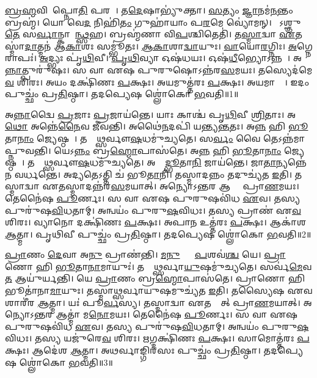 
\ul{𑌬𑍍𑌰}\ul{𑌹𑍍𑌮}𑌵𑌿𑌦𑌾᳚𑌪𑍍𑌨𑍋\ul{𑌤𑌿} 𑌪𑌰𑌮𑍍᳚। 
𑌤\ul{𑌦𑍇}𑌷𑌾𑌭𑍍𑌯𑍁॑𑌕𑍍𑌤𑌾। 
\ul{𑌸}𑌤𑍍𑌯𑌂 \ul{𑌜𑍍𑌞𑌾}𑌨𑌮॑\ul{𑌨}𑌨𑍍𑌤𑌂 𑌬𑍍𑌰𑌹𑍍𑌮॑। 
𑌯𑍋 𑌵𑍇\ul{𑌦} 𑌨𑌿𑌹𑌿॑\ul{𑌤𑌂} 𑌗𑍁𑌹𑌾॑𑌯𑌾𑌂 𑌪\ul{𑌰}𑌮𑍇 𑌵𑍍𑌯𑍋॑𑌮𑌨𑍍। 
𑌸𑍋᳚𑌽𑌶𑍍𑌞𑍁\ul{𑌤𑍇} 𑌸\ul{𑌰𑍍𑌵𑌾}𑌨𑍍𑌕𑌾𑌮𑌾᳚\ul{𑌨𑍍𑌥𑍍𑌸}𑌹। 
𑌬𑍍𑌰𑌹𑍍𑌮॑𑌣𑌾 𑌵𑌿\ul{𑌪}𑌶𑍍𑌚𑌿𑌤𑍇𑌤𑌿॑। 
𑌤\ul{𑌸𑍍𑌮𑌾}𑌦𑍍𑌵𑌾 \ul{𑌏}𑌤𑌸𑍍𑌮𑌾॑\ul{𑌦𑌾}𑌤𑍍𑌮𑌨॑ 𑌆\ul{𑌕𑌾}𑌶𑌃 𑌸𑌮𑍍𑌭𑍂॑𑌤𑌃। 
\ul{𑌆}\ul{𑌕𑌾}𑌶𑌾\ul{𑌦𑍍𑌵𑌾}𑌯𑍁𑌃। 
\ul{𑌵𑌾}𑌯𑍋\ul{𑌰}𑌗𑍍𑌨𑌿𑌃। 
\ul{𑌅}𑌗𑍍𑌨𑍇𑌰𑌾𑌪𑌃॑। 
\ul{𑌅}𑌦𑍍𑌭𑍍𑌯𑌃 𑌪𑍃॑\ul{𑌥𑌿}𑌵𑍀। 
\ul{𑌪𑍃}\ul{𑌥𑌿}𑌵𑍍𑌯𑌾 𑌓𑌷॑𑌧𑌯𑌃। 
𑌓𑌷॑\ul{𑌧𑍀}𑌭𑍍𑌯𑍋𑌽𑌨𑍍𑌨𑌮𑍍᳚। 
𑌅\ul{𑌨𑍍𑌨𑌾}𑌤𑍍𑌪𑍁𑌰𑍁॑𑌷𑌃। 
𑌸 𑌵𑌾 𑌏𑌷 𑌪𑍁𑌰𑍁𑌷𑍋𑌽𑌨𑍍𑌨॑𑌰\ul{𑌸}𑌮𑌯𑌃। 
𑌤𑌸𑍍𑌯𑍇𑌦॑𑌮𑍇\ul{𑌵} 𑌶𑌿𑌰𑌃। 
𑌅𑌯𑌂 𑌦𑌕𑍍𑌷𑌿॑𑌣𑌃 \ul{𑌪}𑌕𑍍𑌷𑌃। 
𑌅𑌯𑌮𑍁𑌤𑍍𑌤॑𑌰𑌃 \ul{𑌪}𑌕𑍍𑌷𑌃। 
𑌅𑌯𑌮𑌾𑌤𑍍𑌮𑌾᳚। 
𑌇𑌦𑌂 𑌪𑍁𑌚𑍍𑌛𑌂॑ 𑌪𑍍𑌰\ul{𑌤𑌿}𑌷𑍍𑌠𑌾। 
𑌤𑌦𑌪𑍍𑌯𑍇𑌷 𑌶𑍍𑌲𑍋॑𑌕𑍋 \ul{𑌭}𑌵𑌤𑌿॥1॥

𑌅\ul{𑌨𑍍𑌨𑌾}𑌦𑍍𑌵𑍈 \ul{𑌪𑍍𑌰}𑌜𑌾𑌃 \ul{𑌪𑍍𑌰}𑌜𑌾𑌯॑𑌨𑍍𑌤𑍇। 
𑌯𑌾𑌃 𑌕𑌾𑌶𑍍𑌚॑ 𑌪𑍃\ul{𑌥𑌿}𑌵𑍀 \ul{𑌶𑍍𑌰𑌿}𑌤𑌾𑌃। 
𑌅\ul{𑌥𑍋} 𑌅𑌨𑍍𑌨𑍇॑\ul{𑌨𑍈}𑌵 𑌜𑍀॑𑌵𑌨𑍍𑌤𑌿। 
𑌅𑌥𑍈॑\ul{𑌨}𑌦𑌪𑌿॑ 𑌯𑌨𑍍𑌤𑍍𑌯\ul{𑌨𑍍𑌤}𑌤𑌃। 
𑌅\ul{𑌨𑍍𑌨}\ul{} 𑌹𑌿 \ul{𑌭𑍂}𑌤𑌾\ul{𑌨𑌾𑌂} 𑌜𑍍𑌯𑍇𑌷𑍍𑌠𑌮𑍍᳚। 
𑌤𑌸𑍍𑌮𑌾᳚𑌥𑍍𑌸𑌰𑍍𑌵𑍗\ul{𑌷}𑌧𑌮𑍁॑𑌚𑍍𑌯𑌤𑍇। 
𑌸\ul{𑌰𑍍𑌵𑌂} 𑌵𑍈 𑌤𑍇𑌽𑌨𑍍𑌨॑𑌮𑌾𑌪𑍍𑌨𑍁𑌵𑌨𑍍𑌤𑌿। 
𑌯𑍇𑌽\ul{𑌨𑍍𑌨𑌂} 𑌬𑍍𑌰\ul{𑌹𑍍𑌮𑍋}𑌪𑌾𑌸॑𑌤𑍇। 
𑌅\ul{𑌨𑍍𑌨}\ul{} 𑌹𑌿 \ul{𑌭𑍂}𑌤𑌾\ul{𑌨𑌾𑌂} 𑌜𑍍𑌯𑍇𑌷𑍍𑌠𑌮𑍍᳚। 
𑌤𑌸𑍍𑌮𑌾᳚𑌥𑍍𑌸𑌰𑍍𑌵𑍗\ul{𑌷}𑌧𑌮𑍁॑𑌚𑍍𑌯𑌤𑍇। 
𑌅𑌨𑍍𑌨𑌾᳚\ul{𑌦𑍍𑌭𑍂}𑌤𑌾\ul{𑌨𑌿} 𑌜𑌾𑌯॑𑌨𑍍𑌤𑍇। 
𑌜𑌾\ul{𑌤𑌾}𑌨𑍍𑌯𑌨𑍍𑌨𑍇॑𑌨 𑌵𑌰𑍍𑌧𑌨𑍍𑌤𑍇। 
𑌅𑌦𑍍𑌯𑌤𑍇𑌽𑌤𑍍𑌤𑌿 𑌚॑ 𑌭𑍂\ul{𑌤𑌾}𑌨𑌿। 
𑌤𑌸𑍍𑌮𑌾𑌦𑌨𑍍𑌨𑌂 𑌤𑌦𑍁𑌚𑍍𑌯॑𑌤 \ul{𑌇}𑌤𑌿। 
𑌤𑌸𑍍𑌮𑌾𑌦𑍍𑌵𑌾 𑌏𑌤𑌸𑍍𑌮𑌾𑌦𑌨𑍍𑌨॑𑌰\ul{𑌸}𑌮𑌯𑌾𑌤𑍍। 
𑌅𑌨𑍍𑌯𑍋𑌽𑌨𑍍𑌤𑌰 𑌆𑌤𑍍𑌮𑌾᳚ 𑌪𑍍𑌰𑌾\ul{𑌣}𑌮𑌯𑌃। 
𑌤𑍇𑌨𑍈॑𑌷 \ul{𑌪𑍂}𑌰𑍍𑌣𑌃। 
𑌸 𑌵𑌾 𑌏𑌷 𑌪𑍁𑌰𑍁𑌷𑌵𑌿॑𑌧 \ul{𑌏}𑌵। 
𑌤𑌸𑍍𑌯 𑌪𑍁𑌰𑍁॑𑌷\ul{𑌵𑌿}𑌧𑌤𑌾𑌮𑍍। 
𑌅𑌨𑍍𑌵𑌯𑌂॑ 𑌪𑍁𑌰𑍁\ul{𑌷}𑌵𑌿𑌧𑌃। 
𑌤𑌸𑍍𑌯 𑌪𑍍𑌰𑌾𑌣॑ 𑌏\ul{𑌵} 𑌶𑌿𑌰𑌃। 
𑌵𑍍𑌯𑌾𑌨𑍋 𑌦𑌕𑍍𑌷𑌿॑𑌣𑌃 \ul{𑌪}𑌕𑍍𑌷𑌃। 
𑌅𑌪𑌾𑌨 𑌉𑌤𑍍𑌤॑𑌰𑌃 \ul{𑌪}𑌕𑍍𑌷𑌃। 
𑌆𑌕𑌾॑𑌶 \ul{𑌆}𑌤𑍍𑌮𑌾। 
𑌪𑍃𑌥𑌿𑌵𑍀 𑌪𑍁𑌚𑍍𑌛𑌂॑ 𑌪𑍍𑌰\ul{𑌤𑌿}𑌷𑍍𑌠𑌾। 
𑌤𑌦𑌪𑍍𑌯𑍇𑌷 𑌶𑍍𑌲𑍋॑𑌕𑍋 \ul{𑌭}𑌵𑌤𑌿॥2॥

\ul{𑌪𑍍𑌰𑌾}𑌣𑌂 \ul{𑌦𑍇}𑌵𑌾 𑌅\ul{𑌨𑍁} 𑌪𑍍𑌰𑌾𑌣॑𑌨𑍍𑌤𑌿। 
\ul{𑌮}\ul{𑌨𑍁}𑌷𑍍𑌯𑌾𑌃᳚ \ul{𑌪}𑌶𑌵॑\ul{𑌶𑍍𑌚} 𑌯𑍇। 
\ul{𑌪𑍍𑌰𑌾}𑌣𑍋 𑌹𑌿 \ul{𑌭𑍂}𑌤𑌾\ul{𑌨𑌾}𑌮𑌾𑌯𑍁𑌃॑। 
𑌤𑌸𑍍𑌮𑌾᳚𑌥𑍍𑌸𑌰𑍍𑌵𑌾\ul{𑌯𑍁}𑌷𑌮𑍁॑𑌚𑍍𑌯𑌤𑍇। 
𑌸𑌰𑍍𑌵॑\ul{𑌮𑍇}𑌵 \ul{𑌤} 𑌆𑌯𑍁॑𑌰𑍍\mbox{}𑌯𑌨𑍍𑌤𑌿। 
𑌯𑍇 \ul{𑌪𑍍𑌰𑌾}𑌣𑌂 𑌬𑍍𑌰\ul{𑌹𑍍𑌮𑍋}𑌪𑌾𑌸॑𑌤𑍇। 
𑌪𑍍𑌰𑌾𑌣𑍋 𑌹𑌿 𑌭𑍂𑌤𑌾॑𑌨𑌾\ul{𑌮𑌾}𑌯𑍁𑌃। 
𑌤𑌸𑍍𑌮𑌾𑌥𑍍𑌸𑌰𑍍𑌵𑌾𑌯𑍁𑌷𑌮𑍁𑌚𑍍𑌯॑𑌤 \ul{𑌇}𑌤𑌿। 
𑌤𑌸𑍍𑌯𑍈𑌷 𑌏𑌵 𑌶𑌾𑌰𑍀॑𑌰 \ul{𑌆}𑌤𑍍𑌮𑌾। 
𑌯𑌃॑ 𑌪𑍂\ul{𑌰𑍍𑌵}𑌸𑍍𑌯। 
𑌤𑌸𑍍𑌮𑌾𑌦𑍍𑌵𑌾 𑌏𑌤𑌸𑍍𑌮𑌾᳚𑌤𑍍 𑌪𑍍𑌰𑌾\ul{𑌣}𑌮𑌯𑌾𑌤𑍍। 
𑌅𑌨𑍍𑌯𑍋𑌽𑌨𑍍𑌤𑌰 𑌆𑌤𑍍𑌮𑌾॑ 𑌮\ul{𑌨𑍋}𑌮𑌯𑌃। 
𑌤𑍇𑌨𑍈॑𑌷 \ul{𑌪𑍂}𑌰𑍍𑌣𑌃। 
𑌸 𑌵𑌾 𑌏𑌷 𑌪𑍁𑌰𑍁𑌷𑌵𑌿॑𑌧 \ul{𑌏}𑌵। 
𑌤𑌸𑍍𑌯 𑌪𑍁𑌰𑍁॑𑌷\ul{𑌵𑌿}𑌧𑌤𑌾𑌮𑍍। 
𑌅𑌨𑍍𑌵𑌯𑌂॑ 𑌪𑍁𑌰𑍁\ul{𑌷}𑌵𑌿𑌧𑌃। 
𑌤𑌸𑍍𑌯 𑌯𑌜𑍁॑𑌰𑍇\ul{𑌵} 𑌶𑌿𑌰𑌃। 
𑌋𑌗𑍍𑌦𑌕𑍍𑌷𑌿॑𑌣𑌃 \ul{𑌪}𑌕𑍍𑌷𑌃। 
𑌸𑌾𑌮𑍋𑌤𑍍𑌤॑𑌰𑌃 \ul{𑌪}𑌕𑍍𑌷𑌃। 
𑌆𑌦𑍇॑𑌶 \ul{𑌆}𑌤𑍍𑌮𑌾। 
𑌅𑌥𑌰𑍍𑌵𑌾𑌙𑍍𑌗𑌿𑌰𑌸𑌃 𑌪𑍁𑌚𑍍𑌛𑌂॑ 𑌪𑍍𑌰\ul{𑌤𑌿}𑌷𑍍𑌠𑌾। 
𑌤𑌦𑌪𑍍𑌯𑍇𑌷 𑌶𑍍𑌲𑍋॑𑌕𑍋 \ul{𑌭}𑌵𑌤𑌿॥3॥

